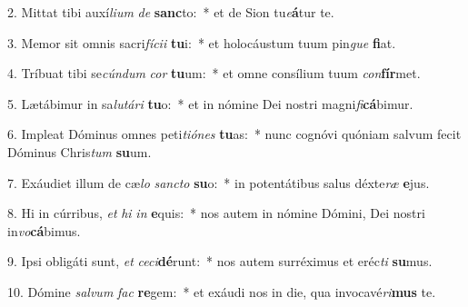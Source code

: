2. Mittat tibi auxí\textit{li}\textit{um} \textit{de} \textbf{sanc}to:~*  et de Sion tu\textit{e}\textbf{á}tur te.\

3. Memor sit omnis sacri\textit{fí}\textit{ci}\textit{i} \textbf{tu}i:~*  et holocáustum tuum pin\textit{gue} \textbf{fi}at.\

4. Tríbuat tibi se\textit{cún}\textit{dum} \textit{cor} \textbf{tu}um:~*  et omne consílium tuum \textit{con}\textbf{fír}met.\

5. Lætábimur in sa\textit{lu}\textit{tá}\textit{ri} \textbf{tu}o:~*  et in nómine Dei nostri magni\textit{fi}\textbf{cá}bimur.\

6. Impleat Dóminus omnes peti\textit{ti}\textit{ó}\textit{nes} \textbf{tu}as:~*  nunc cognóvi quóniam salvum fecit Dóminus Chris\textit{tum} \textbf{su}um.\

7. Exáudiet illum de cæ\textit{lo} \textit{sanc}\textit{to} \textbf{su}o:~*  in potentátibus salus déxte\textit{ræ} \textbf{e}jus.\

8. Hi in cúrribus, \textit{et} \textit{hi} \textit{in} \textbf{e}quis:~*  nos autem in nómine Dómini, Dei nostri in\textit{vo}\textbf{cá}bimus.\

9. Ipsi obligáti sunt, \textit{et} \textit{ce}\textit{ci}\textbf{dé}runt:~*  nos autem surréximus et eréc\textit{ti} \textbf{su}mus.\

10. Dómine \textit{sal}\textit{vum} \textit{fac} \textbf{re}gem:~*  et exáudi nos in die, qua invocavé\textit{ri}\textbf{mus} te.\

